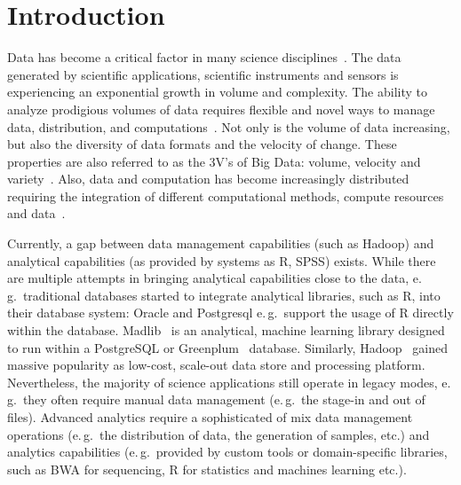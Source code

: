 \documentclass{sig-alternate}
\begin{document}
\date{}
\maketitle

\begin{abstract} 


\end{abstract}

\section{Introduction} 

Data has become a critical factor in many science disciplines~\cite{hey2009}.
The data generated by scientific applications, scientific instruments and
sensors is experiencing an exponential growth in volume and complexity. The
ability to analyze prodigious volumes of data requires flexible and novel ways
to manage data, distribution, and computations~\cite{Jha:2011fk}. Not only is
the volume of data increasing, but also the diversity of data formats and the
velocity of change. These properties are also referred to as the 3V's of Big
Data: volume, velocity and variety~\cite{ibm_bigdata_book}. Also, data and 
computation has become increasingly distributed requiring the integration of 
different computational methods, compute resources and data~\cite{nsf_aci}.


Currently, a gap between data management capabilities (such as Hadoop) and
analytical capabilities (as provided by systems as R, SPSS) exists. While
there are multiple attempts in bringing analytical capabilities close to the
data, e.\,g.\ traditional databases started to integrate analytical libraries,
such as R, into their database system: Oracle and Postgresql e.\,g.\ support
the usage of R directly within the database.
Madlib~\cite{Hellerstein:2012:MAL:2367502.2367510} is an analytical, machine
learning library designed to run within a PostgreSQL or
Greenplum~\cite{greenplum} database. Similarly, Hadoop~\cite{hadoop} gained
massive popularity as low-cost, scale-out data store and processing platform.
Nevertheless, the majority of science applications still operate in legacy
modes, e.\,g.\ they often require manual data management (e.\,g.\ the stage-in
and out of files). Advanced analytics require a sophisticated of mix data
management operations (e.\,g.\ the distribution of data, the generation of
samples, etc.) and analytics capabilities (e.\,g.\ provided by custom tools or
domain-specific libraries, such as BWA for sequencing, R for statistics and
machines learning etc.).
\end{document}
